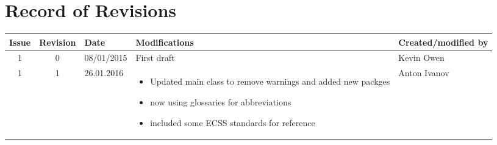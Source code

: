 \section*{Record of Revisions}
\begin{table}[h!]
    \centering
    \begin{tabular}{|c|c|l|p{6cm}|l|}
      \hline
      \textbf{Issue} & \textbf{Revision} &  \textbf{Date} &  \textbf{Modifications} & \textbf{Created/modified by} \\ \hline
      1 & 0      & 08/01/2015 & First draft & Kevin Owen \\
      \hline
       1& 1      & 26.01.2016 & 
                                \begin{itemize}
                                \item Updated main class to remove
                                  warnings and added new packges
                                \item now using glossaries for
                                  abbreviations
                                \item included some ECSS standards for reference
                                \end{itemize}
 &  Anton Ivanov\\
      \hline
    \end{tabular}
\end{table}

